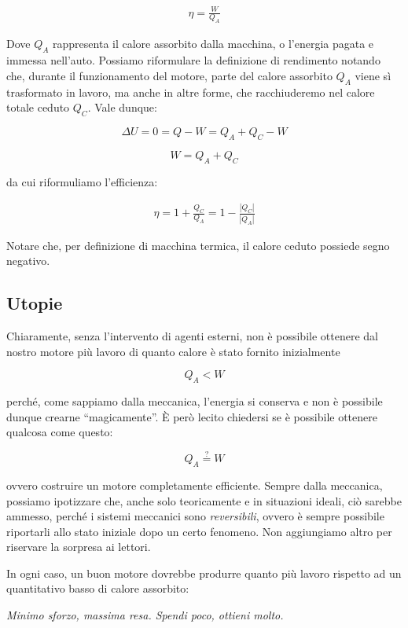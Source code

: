 \begin{align}
    \eta = \frac{W}{Q_A}
\end{align}


\noindent Dove $Q_A$ rappresenta il calore assorbito dalla macchina, o l'energia pagata
e immessa nell'auto. Possiamo riformulare la definizione di rendimento
notando che, durante il funzionamento del motore, parte del calore assorbito
$Q_A$ viene sì trasformato in lavoro, ma anche in altre forme, che racchiuderemo
nel calore totale ceduto $Q_C$. Vale dunque:

\[ \Delta U = 0 = Q - W = Q_A + Q_C - W \]

\[ W = Q_A + Q_C \]

\noindent da cui riformuliamo l'efficienza:

\begin{align}
    \eta = 1 + \frac{Q_C}{Q_A} = 1 - \frac{|Q_C|}{|Q_A|}
\end{align}

\noindent Notare che, per definizione di macchina termica, il calore
ceduto possiede segno negativo.

\subsection*{Utopie}
Chiaramente, senza l'intervento di agenti esterni, non è possibile
ottenere dal nostro motore più lavoro di quanto calore è stato fornito
inizialmente

\[ Q_A < W \]

\noindent perché, come sappiamo dalla meccanica, l'energia si conserva
e non è possibile dunque crearne ``magicamente''. È però lecito chiedersi
se è possibile ottenere qualcosa come questo:

\[ Q_A \stackrel{?}{=} W \]

\noindent ovvero costruire un motore completamente efficiente. Sempre
dalla meccanica, possiamo ipotizzare che, anche solo teoricamente e
in situazioni ideali, ciò sarebbe ammesso, perché i sistemi meccanici
sono \textit{reversibili}, ovvero è sempre possibile riportarli allo
stato iniziale dopo un certo fenomeno. Non aggiungiamo altro per riservare
la sorpresa ai lettori.

In ogni caso, un buon motore dovrebbe produrre quanto più lavoro rispetto
ad un quantitativo basso di calore assorbito:

\begin{center}
    \textit{Minimo sforzo, massima resa. Spendi poco, ottieni molto.}
\end{center}

